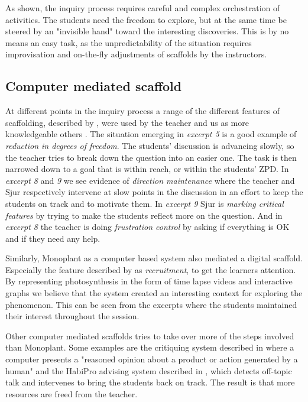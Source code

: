 As shown, the inquiry process requires careful and complex orchestration of activities. The students need the freedom to explore, but at the same time be steered by an "invisible hand" toward the interesting discoveries. This is by no means an easy task, as the unpredictability of the situation requires improvisation and on-the-fly adjustments of scaffolds by the instructors.  

\subsection{Computer mediated scaffold}
At different points in the inquiry process a range of the different features of scaffolding, described by \citet{wood1976role}, were used by the teacher and us as more knowledgeable others \citep{vygotskiui1978mind}. The situation emerging in \emph{excerpt 5} is a good example of \emph{reduction in degrees of freedom}. The students' discussion is advancing slowly, so the teacher tries to break down the question into an easier one. The task is then narrowed down to a goal that is within reach, or within the students' ZPD. In \emph{excerpt 8} and \emph{9} we see evidence of \emph{direction maintenance} where the teacher and Sjur respectively intervene at slow points in the discussion in an effort to keep the students on track and to motivate them. In \emph{excerpt 9} Sjur is \emph{marking critical features} by trying to make the students reflect more on the question. And in \emph{excerpt 8} the teacher is doing \emph{frustration control} by asking if everything is OK and if they need any help. 

Similarly, Monoplant as a computer based system also mediated a digital scaffold. Especially the feature described by \citet{wood1976role} as \emph{recruitment}, to get the learners attention. By representing photosynthesis in the form of time lapse videos and interactive graphs we believe that the system created an interesting context for exploring the phenomenon. This can be seen from the excerpts where the students maintained their interest throughout the session. 

Other computer mediated scaffolds tries to take over more of the steps involved than Monoplant. Some examples are the critiquing system described in \citet{fischer1991critics} where a computer presents a "reasoned opinion about a product or action generated by a human" and the HabiPro advising system described in \citet{soller2005mirroring}, which detects off-topic talk and intervenes to bring the students back on track. The result is that more resources are freed from the teacher.


